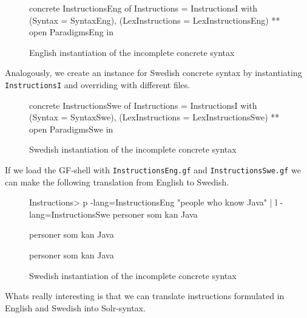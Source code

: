 \begin{figure}[H]
\begin{code}
concrete InstructionsEng of Instructions = InstructionsI with 
                                             (Syntax = SyntaxEng), 
                                             (LexInstructions = LexInstructionsEng) 
                                             ** open ParadigmsEng in {}
\end{code}
\caption{English instantiation of the incomplete concrete syntax}
\end{figure}

Analogously, we create an instance for Swedish concrete syntax by instantiating \texttt{InstructionsI} and overriding with different files.

\begin{figure}[H]
\begin{code}
concrete InstructionsSwe of Instructions = InstructionsI with 
                                             (Syntax = SyntaxSwe), 
                                             (LexInstructions = LexInstructionsSwe) 
                                             ** open ParadigmsSwe in {}
\end{code}
\caption{Swedish instantiation of the incomplete concrete syntax}
\end{figure}

If we load the GF-shell with \texttt{InstructionsEng.gf} and \texttt{InstructionsSwe.gf} we can make the following translation from English to Swedish.

\begin{figure}[H]
\begin{code}
Instructions> p -lang=InstructionsEng "people who know Java" | l -lang=InstructionsSwe
personer som kan Java

personer som kan Java

personer som kan Java

\end{code}
\caption{Swedish instantiation of the incomplete concrete syntax}
\end{figure}

 Whats really interesting is that we can translate instructions formulated in English and Swedish into Solr-syntax.